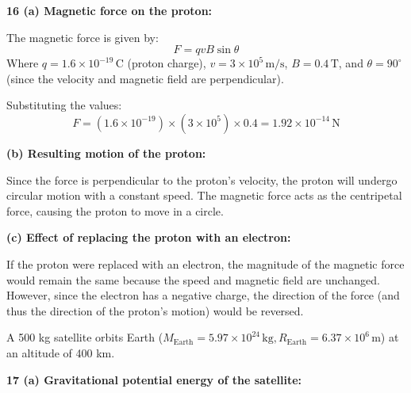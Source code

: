 \documentclass[addpoints]{exam}
\begin{document}
\begin{questions}
\begin{solution}[8cm]
\textbf{16 (a) Magnetic force on the proton:}

The magnetic force is given by:  
\[
F = q v B \sin \theta
\]  
Where \( q = 1.6 \times 10^{-19} \, \text{C} \) (proton charge), \( v = 3 \times 10^5 \, \text{m/s} \), \( B = 0.4 \, \text{T} \), and \( \theta = 90^\circ \) (since the velocity and magnetic field are perpendicular).  

Substituting the values:  
\[
F = (1.6 \times 10^{-19}) \times (3 \times 10^5) \times 0.4 = 1.92 \times 10^{-14} \, \text{N}
\]  

\textbf{(b) Resulting motion of the proton:}

Since the force is perpendicular to the proton's velocity, the proton will undergo circular motion with a constant speed. The magnetic force acts as the centripetal force, causing the proton to move in a circle.

\textbf{(c) Effect of replacing the proton with an electron:}

If the proton were replaced with an electron, the magnitude of the magnetic force would remain the same because the speed and magnetic field are unchanged. However, since the electron has a negative charge, the direction of the force (and thus the direction of the proton's motion) would be reversed.

\end{solution}


\question A 500 kg satellite orbits Earth (\( M_{\text{Earth}} = 5.97 \times 10^{24} \, \text{kg}, R_{\text{Earth}} = 6.37 \times 10^6 \, \text{m} \)) at an altitude of 400 km.  
\begin{solution}[8cm]
\textbf{17 (a) Gravitational potential energy of the satellite:}


\end{solution}
\end{questions}
\end{document}
